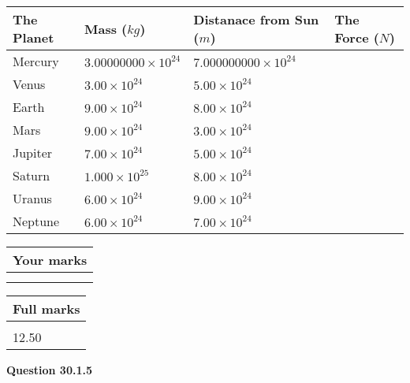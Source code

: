 \documentclass[12pt]{article}
\begin{document}
\vspace{0.2in}
 
 
\begin{tabular}{|l|l|l|l|}
\hline
The Planet & Mass ($kg$) & Distanace from Sun ($m$) & The Force ($N$)\\
\hline
Mercury  &
           $ %
3.00000000 \times 10^{24} $   &
             $ %
7.000000000 \times 10^{24} $    &
\\  \hline
Venus    &
           $ %
3.00 \times 10^{24} $    &
             $ %
5.00 \times 10^{24} $    &
\\  \hline
Earth    &
           $ %
9.00 \times 10^{24} $    &
             $ %
8.00 \times 10^{24} $    &
\\   \hline
Mars     &
           $ %
9.00 \times 10^{24} $    &
             $ %
3.00 \times 10^{24} $    &
\\   \hline
Jupiter  &
           $ %
7.00 \times 10^{24} $    &
             $ %
5.00 \times 10^{24} $    &
\\  \hline
Saturn   &
           $ %
1.000 \times 10^{25}$    &
             $ %
8.00 \times 10^{24}$    &
\\  \hline
Uranus   &
           $ %
6.00 \times 10^{24} $    &
             $ %
9.00 \times 10^{24} $    &
\\  \hline
Neptune  &
           $ %
6.00 \times 10^{24} $    &
             $ %
7.00 \times 10^{24} $    &
\\  \hline
 
\end{tabular}
 
 

 
 

 
\vspace{0.3in}
  
\vspace{0.2in}
  
         \begin{tabular}{|l|}
\hline
 Your marks  \\
\hline
 \\ 
 \\ 
\hline
\end{tabular}
\hspace{0.05in} \begin{tabular}{|l|}
\hline
 Full marks  \\
\hline
 \\ 
12.50 \\
\hline
\end{tabular}
{\textbf{\Large{Question
30.1.5 
}}}
  
\end{document}
